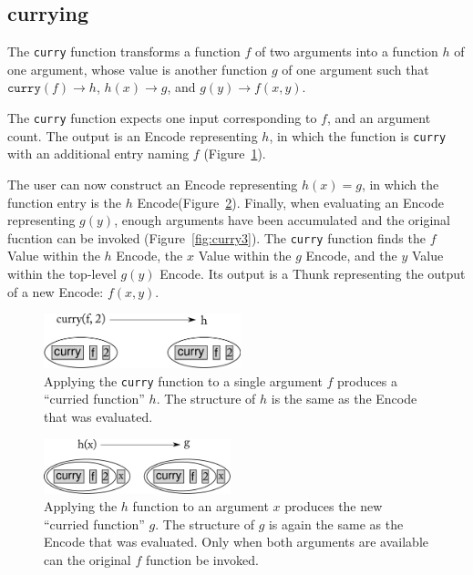 \documentclass{article}
\newcommand{\valuex}{\textrm{Value}\xspace}
\newcommand{\encode}{\textrm{Encode}\xspace}
\newcommand{\thunk}{\textrm{Thunk}\xspace}
\newcommand{\bs}{\vspace{\baselineskip}}
\begin{document}
\subsection{currying} The \texttt{curry} function transforms
a function $f$ of two arguments into a function $h$ of one argument,
whose value is another function $g$ of one argument such that $\texttt{curry}(f) \rightarrow h$, $h(x) \rightarrow g$, and $g(y) \rightarrow f(x,y)$.

\bs

The \texttt{curry} function expects one input corresponding to $f$,
and an argument count. The output is an \encode representing
$h$, in which the function is \texttt{curry} with an additional entry
naming $f$ (Figure~\ref{fig:curry1}).

\bs

The user can now construct an \encode representing $h(x) = g$, in
which the function entry is the $h$ \encode (Figure~\ref{fig:curry2}).
Finally, when evaluating an \encode representing $g(y)$, enough
arguments have been accumulated and the original fucntion can be
invoked (Figure~\ref{fig:curry3}). The \texttt{curry} function finds
the $f$ \valuex within the $h$ \encode, the $x$ \valuex within the $g$
\encode, and the $y$ \valuex within the top-level $g(y)$ \encode.  Its
output is a \thunk representing the output of a new \encode: $f(x,y)$.

\begin{figure}[h!]
  \begin{centering}
    \includegraphics[height=60px]{curry1.pdf}

  \end{centering}

  \caption{Applying the \texttt{curry} function to a single argument $f$ produces a ``curried function'' $h$. The structure of $h$ is the same as the \encode that was evaluated.}
  \label{fig:curry1}
\end{figure}

\enlargethispage{3 \baselineskip}

\begin{figure}[h!]
  \begin{centering}
    \includegraphics[height=60px]{curry2.pdf}

  \end{centering}

  \caption{Applying the $h$ function to an argument $x$ produces the new ``curried function'' $g$. The structure of $g$ is again the same as the \encode that was evaluated. Only
  when both arguments are available can the original $f$ function be invoked.}
  \label{fig:curry2}
\end{figure}
\end{document}
